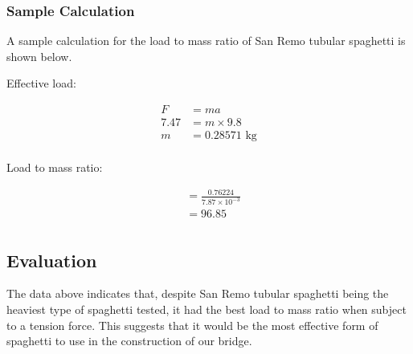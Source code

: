 \documentclass[a4paper,11pt]{article}
\begin{document}
\begin{center}
\end{center}


\subsubsection{Sample Calculation}

A sample calculation for the load to mass ratio of San Remo tubular spaghetti
is shown below.

Effective load:

$$
\begin{aligned}
F & = ma \\
7.47 & = m \times 9.8 \\
m & = 0.28571\mbox{ kg} \\
\end{aligned}
$$

Load to mass ratio:

$$
\begin{aligned}
& = \frac{0.76224}{7.87 \times 10^{-3}} \\
& = 96.85 \\
\end{aligned}
$$


\subsection{Evaluation}

The data above indicates that, despite San Remo tubular spaghetti being the
heaviest type of spaghetti tested, it had the best load to mass ratio when
subject to a tension force.
This suggests that it would be the most effective form of spaghetti to use in
the construction of our bridge.
\end{document}
